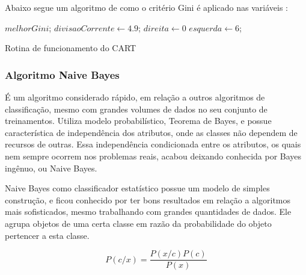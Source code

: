 Abaixo segue um algoritmo de como o critério Gini é aplicado nas variáveis \cite{Raimundo2008}:

\IncMargin{1em}
\begin{algorithm}[h]

\nl $melhorGini$; 
\nl $divisaoCorrente \leftarrow 4.9$; 
\nl $direita \leftarrow 0$\; 
\nl $esquerda \leftarrow 6$; 
\nl {}
 \caption{Rotina de funcionamento do CART}\label{alg:gini}
 
\end{algorithm}
\DecMargin{1em}


\subsubsection{Algoritmo Naive Bayes}\label{cap:refTeor:sssec:nbayes}
É um algoritmo considerado rápido, em relação a outros algoritmos de classificação, mesmo com grandes volumes de dados no seu conjunto de treinamentos. Utiliza modelo probabilístico, Teorema de Bayes, e possue característica de independência dos atributos, onde as classes não dependem de recursos de outras. Essa independência condicionada  entre os atributos, os quais nem sempre ocorrem nos problemas reais, acabou deixando conhecida por Bayes ingênuo, ou Naive Bayes.

Naive Bayes como classificador estatístico possue um modelo de simples construção, e ficou conhecido por ter bons resultados em relação a algoritmos mais sofisticados, mesmo trabalhando com grandes quantidades de dados. Ele agrupa objetos de uma certa classe em razão da probabilidade do objeto pertencer a esta classe. 

\begin{equation}
 P(c/x)= \frac{P(x/c)P(c)}{P(x)}
\end{equation}

